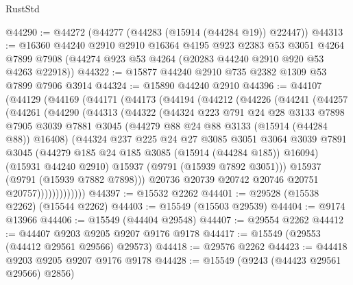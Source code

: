 \begin{lexlean}{RustStd}
\begin{coremodule}
@44290 := @44272 (@44277 (@44283 (@15914 (@44284 @19)) @22447))
@44313 := @16360
    @44240
    @2910
    @2910
    @16364
    @4195
    @923
    @2383
    @53
    @3051
    @4264
    @7899
    @7908
    (@44274 @923 @53 @4264 (@20283 @44240 @2910 @920 @53 @4263 @22918))
@44322 := @15877 @44240 @2910 @735 @2382 @1309 @53 @7899 @7906 @3914
@44324 := @15890 @44240 @2910
@44396 := @44107
    (@44129
      (@44169
        (@44171
          (@44173
            (@44194
              (@44212
                (@44226
                  (@44241
                    (@44257
                      (@44261
                        (@44290
                          (@44313
                            (@44322
                              (@44324
                                @223
                                @791
                                @24
                                @28
                                @3133
                                @7898
                                @7905
                                @3039
                                @7881
                                @3045
                                (@44279 @88 @24 @88 @3133 (@15914 (@44284 @88)) @16408)
                                (@44324
                                  @237
                                  @225
                                  @24
                                  @27
                                  @3085
                                  @3051
                                  @3064
                                  @3039
                                  @7891
                                  @3045
                                  (@44279 @185 @24 @185 @3085 (@15914 (@44284 @185)) @16094)
                                  (@15931 @44240 @2910)
                                  @15937
                                  (@9791 (@15939 @7892 @3051)))
                                @15937
                                (@9791 (@15939 @7882 @7898)))
                              @20736
                              @20739
                              @20742
                              @20746
                              @20751
                              @20757)))))))))))))
@44397 := @15532 @2262
@44401 := @29528 (@15538 @2262) (@15544 @2262)
@44403 := @15549 (@15503 @29539)
@44404 := @9174 @13966
@44406 := @15549 (@44404 @29548)
@44407 := @29554 @2262
@44412 := @44407 @9203 @9205 @9207 @9176 @9178
@44417 := @15549 (@29553 (@44412 @29561 @29566) @29573)
@44418 := @29576 @2262
@44423 := @44418 @9203 @9205 @9207 @9176 @9178
@44428 := @15549 (@9243 (@44423 @29561 @29566) @2856)

\end{coremodule}
\end{lexlean}
